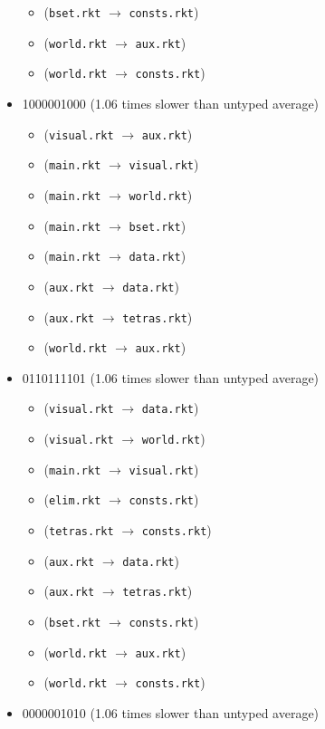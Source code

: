 \documentclass{article}
\newcommand{\mono}[1]{\texttt{#1}}
\begin{document}
\begin{itemize}
\begin{itemize}
  \item (\mono{bset.rkt} $\rightarrow$ \mono{consts.rkt})
  \item (\mono{world.rkt} $\rightarrow$ \mono{aux.rkt})
  \item (\mono{world.rkt} $\rightarrow$ \mono{consts.rkt})
  \end{itemize}
\item 1000001000 (1.06 times slower than untyped average)
  \begin{itemize}
  \item (\mono{visual.rkt} $\rightarrow$ \mono{aux.rkt})
  \item (\mono{main.rkt} $\rightarrow$ \mono{visual.rkt})
  \item (\mono{main.rkt} $\rightarrow$ \mono{world.rkt})
  \item (\mono{main.rkt} $\rightarrow$ \mono{bset.rkt})
  \item (\mono{main.rkt} $\rightarrow$ \mono{data.rkt})
  \item (\mono{aux.rkt} $\rightarrow$ \mono{data.rkt})
  \item (\mono{aux.rkt} $\rightarrow$ \mono{tetras.rkt})
  \item (\mono{world.rkt} $\rightarrow$ \mono{aux.rkt})
  \end{itemize}
\item 0110111101 (1.06 times slower than untyped average)
  \begin{itemize}
  \item (\mono{visual.rkt} $\rightarrow$ \mono{data.rkt})
  \item (\mono{visual.rkt} $\rightarrow$ \mono{world.rkt})
  \item (\mono{main.rkt} $\rightarrow$ \mono{visual.rkt})
  \item (\mono{elim.rkt} $\rightarrow$ \mono{consts.rkt})
  \item (\mono{tetras.rkt} $\rightarrow$ \mono{consts.rkt})
  \item (\mono{aux.rkt} $\rightarrow$ \mono{data.rkt})
  \item (\mono{aux.rkt} $\rightarrow$ \mono{tetras.rkt})
  \item (\mono{bset.rkt} $\rightarrow$ \mono{consts.rkt})
  \item (\mono{world.rkt} $\rightarrow$ \mono{aux.rkt})
  \item (\mono{world.rkt} $\rightarrow$ \mono{consts.rkt})
  \end{itemize}
\item 0000001010 (1.06 times slower than untyped average)

\end{itemize}
\end{document}
